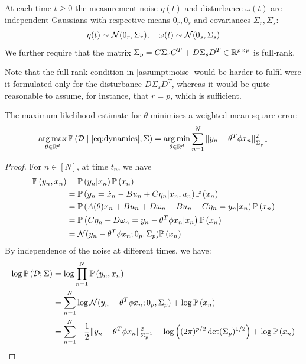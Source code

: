 \documentclass{article}
\begin{document}
\begin{assumption}
\label{assumpt:noise}
At each time $t\geq0$ the measurement noise $\eta(t)$ and disturbance $\omega(t)$  are independent Gaussians with respective means $0_r, 0_s$ and covariances $\Sigma_r, \Sigma_s$:
\begin{equation*}
    \eta(t)\sim \mathcal{N}(0_r,\Sigma_r),\quad\omega(t)\sim \mathcal{N}(0_s,\Sigma_s)
\end{equation*}
We further require that the matrix $\Sigma_p = C\Sigma_r C^T + D\Sigma_s D^T \in \mathbb{R}^{p\times p}$ is full-rank.
\end{assumption}

Note that the full-rank condition in \autoref{assumpt:noise} would be harder to fulfil were it formulated only for the disturbance $D\Sigma_s D^T$, whereas it would be quite reasonable to assume, for instance, that $r=p$, which is sufficient.

\begin{proposition}
\label{prop:mle}
The maximum likelihood estimate for $\theta$ minimises a weighted mean square error:
\begin{equation*}
    \operatorname*{arg\,max}_{\theta\in\mathbb{R}^d} \mathbb{P}\left(\mathcal{D}\;\middle|\;\eqref{eq:dynamics};\Sigma\right) = \operatorname*{arg\,min}_{\theta\in\mathbb{R}^d} \sum_{n=1}^N \|y_n -\theta^T\phi x_n\|_{\Sigma_p^{-1}}^2
\end{equation*}
\end{proposition}
\begin{proof}
For $n\in[N]$, at time $t_n$, we have
\begin{align*}
    \mathbb{P}\left(y_n, x_n\right) 
    &= \mathbb{P}\left(y_n|x_n\right)\mathbb{P}\left(x_n\right)\\
    &= \mathbb{P}\left(y_n = \dot{x}_n - Bu_n +C\eta_n|x_n,u_n\right)\mathbb{P}\left(x_n\right)\\
    &= \mathbb{P}\left(A(\theta)x_n + B u_n + D \omega_n - Bu_n +C\eta_n = y_n|x_n\right)\mathbb{P}\left(x_n\right)\\
    &= \mathbb{P}\left(C\eta_n + D \omega_n = y_n- \theta^T \phi x_n |x_n\right)\mathbb{P}\left(x_n\right)\\
    &= \mathcal{N}(y_n - \theta^T \phi x_n; 0_p,\Sigma_p)\mathbb{P}\left(x_n\right)
\end{align*}
By independence of the noise at different times, we have:
\begin{align*}
    \log\mathbb{P}\left(\mathcal{D};\Sigma\right) &= \log\prod_{n=1}^N\mathbb{P}\left(y_n, x_n\right)\\
    &= \sum_{n=1}^N\log \mathcal{N}(y_n- \theta^T \phi x_n;0_p,\Sigma_p) + \log\mathbb{P}\left(x_n\right)\\
    &= \sum_{n=1}^N -\frac{1}{2} \|y_n -\theta^T\phi x_n\|_{\Sigma_p^{-1}}^2 - \log\left((2\pi)^{p/2} \det(\Sigma_p)^{1/2}\right) + \log\mathbb{P}\left(x_n\right)
\end{align*}
\end{proof}
\end{document}
